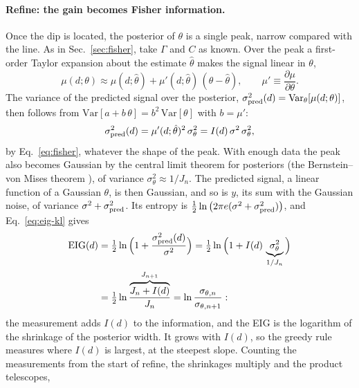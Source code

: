 \paragraph{Refine: the gain becomes Fisher information.} Once the dip is located, the posterior of $\theta$ is a
single peak, narrow compared with the line. As in Sec.~\ref{sec:fisher}, take $\Gamma$ and $C$ as known. Over the
peak a first-order Taylor expansion about the estimate $\hat\theta$ makes the signal linear in $\theta$,
\begin{equation}
  \mu(d;\theta)\approx\mu(d;\hat\theta)+\mu'(d;\hat\theta)\,(\theta-\hat\theta),\qquad
  \mu'\equiv\frac{\partial\mu}{\partial\theta}.
  \label{eq:linearize}
\end{equation}
The variance of the predicted signal over the posterior, $\sigma^2_{\rm pred}(d)=\mathrm{Var}_\theta[\mu(d;\theta)]$,
then follows from $\mathrm{Var}[a+b\,\theta]=b^2\,\mathrm{Var}[\theta]$ with $b=\mu'$:
\begin{equation}
  \sigma^2_{\rm pred}(d)=\mu'(d;\hat\theta)^2\,\sigma_\theta^2=I(d)\,\sigma^2\,\sigma_\theta^2,
  \label{eq:sigma-pred}
\end{equation}
by Eq.~\eqref{eq:fisher}, whatever the shape of the peak. With enough data the peak also becomes Gaussian by the
central limit theorem for posteriors (the Bernstein--von Mises theorem \cite{vandervaart1998}), of variance
$\sigma_\theta^2\approx1/J_n$. The predicted signal, a linear function of a Gaussian $\theta$, is then Gaussian, and
so is $y$, its sum with the Gaussian noise, of variance $\sigma^2+\sigma^2_{\rm pred}$. Its entropy is
$\tfrac12\ln\big(2\pi e(\sigma^2+\sigma^2_{\rm pred})\big)$, and Eq.~\eqref{eq:eig-kl} gives
\begin{equation}
  \begin{aligned}
  \mathrm{EIG}(d)&=\tfrac12\ln\Big(1+\frac{\sigma^2_{\rm pred}(d)}{\sigma^2}\Big)
  =\tfrac12\ln\Big(1+I(d)\,\underbrace{\sigma_\theta^2}_{1/J_n}\Big)\\
  &=\tfrac12\ln\frac{\overbrace{J_n+I(d)}^{J_{n+1}}}{J_n}
  =\ln\frac{\sigma_{\theta,n}}{\sigma_{\theta,n+1}}:
  \end{aligned}
  \label{eq:eig-fisher}
\end{equation}
the measurement adds $I(d)$ to the information, and the EIG is the logarithm of the shrinkage of the posterior
width. It grows with $I(d)$, so the greedy rule measures where $I(d)$ is largest, at the steepest slope. Counting
the measurements from the start of refine, the shrinkages multiply and the product telescopes,
